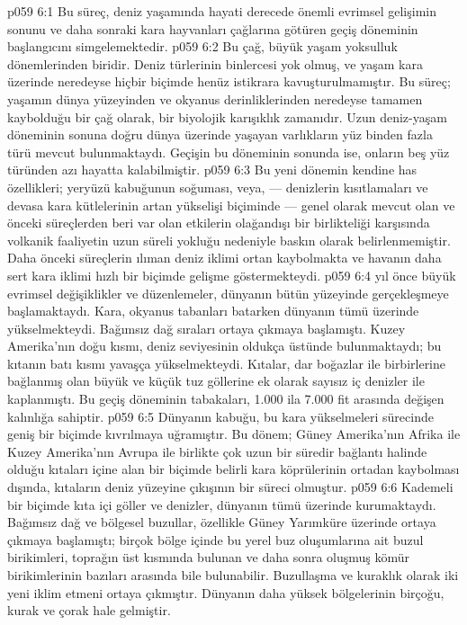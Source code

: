 \vs p059 6:1 Bu süreç, deniz yaşamında hayati derecede önemli evrimsel gelişimin sonunu ve daha sonraki kara hayvanları çağlarına götüren geçiş döneminin başlangıcını simgelemektedir.
\vs p059 6:2 Bu çağ, büyük yaşam yoksulluk dönemlerinden biridir. Deniz türlerinin binlercesi yok olmuş, ve yaşam kara üzerinde neredeyse hiçbir biçimde henüz istikrara kavuşturulmamıştır. Bu süreç; yaşamın dünya yüzeyinden ve okyanus derinliklerinden neredeyse tamamen kaybolduğu bir çağ olarak, bir biyolojik karışıklık zamanıdır. Uzun deniz\hyp{}yaşam döneminin sonuna doğru dünya üzerinde yaşayan varlıkların yüz binden fazla türü mevcut bulunmaktaydı. Geçişin bu döneminin sonunda ise, onların beş yüz türünden azı hayatta kalabilmiştir.
\vs p059 6:3 Bu yeni dönemin kendine has özellikleri; yeryüzü kabuğunun soğuması, veya, --- denizlerin kısıtlamaları ve devasa kara kütlelerinin artan yükselişi biçiminde --- genel olarak mevcut olan ve önceki süreçlerden beri var olan etkilerin olağandışı bir birlikteliği karşısında volkanik faaliyetin uzun süreli yokluğu nedeniyle baskın olarak belirlenmemiştir. Daha önceki süreçlerin ılıman deniz iklimi ortan kaybolmakta ve havanın daha sert kara iklimi hızlı bir biçimde gelişme göstermekteydi.
\vs p059 6:4  yıl önce büyük evrimsel değişiklikler ve düzenlemeler, dünyanın bütün yüzeyinde gerçekleşmeye başlamaktaydı. Kara, okyanus tabanları batarken dünyanın tümü üzerinde yükselmekteydi. Bağımsız dağ sıraları ortaya çıkmaya başlamıştı. Kuzey Amerika’nın doğu kısmı, deniz seviyesinin oldukça üstünde bulunmaktaydı; bu kıtanın batı kısmı yavaşça yükselmekteydi. Kıtalar, dar boğazlar ile birbirlerine bağlanmış olan büyük ve küçük tuz göllerine ek olarak sayısız iç denizler ile kaplanmıştı. Bu geçiş döneminin tabakaları, 1.000 ila 7.000 fit arasında değişen kalınlığa sahiptir.
\vs p059 6:5 Dünyanın kabuğu, bu kara yükselmeleri sürecinde geniş bir biçimde kıvrılmaya uğramıştır. Bu dönem; Güney Amerika’nın Afrika ile Kuzey Amerika’nın Avrupa ile birlikte çok uzun bir süredir bağlantı halinde olduğu kıtaları içine alan bir biçimde belirli kara köprülerinin ortadan kaybolması dışında, kıtaların deniz yüzeyine çıkışının bir süreci olmuştur.
\vs p059 6:6 Kademeli bir biçimde kıta içi göller ve denizler, dünyanın tümü üzerinde kurumaktaydı. Bağımsız dağ ve bölgesel buzullar, özellikle Güney Yarımküre üzerinde ortaya çıkmaya başlamıştı; birçok bölge içinde bu yerel buz oluşumlarına ait buzul birikimleri, toprağın üst kısmında bulunan ve daha sonra oluşmuş kömür birikimlerinin bazıları arasında bile bulunabilir. Buzullaşma ve kuraklık olarak iki yeni iklim etmeni ortaya çıkmıştır. Dünyanın daha yüksek bölgelerinin birçoğu, kurak ve çorak hale gelmiştir.
